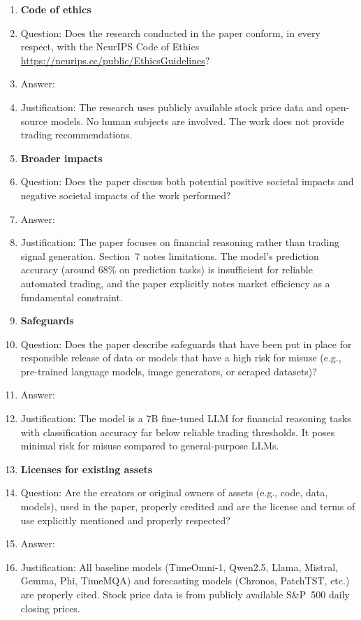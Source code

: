 \begin{enumerate}
\item {\bf Code of ethics}
    \item[] Question: Does the research conducted in the paper conform, in every respect, with the NeurIPS Code of Ethics \url{https://neurips.cc/public/EthicsGuidelines}?
    \item[] Answer: \answerYes{}
    \item[] Justification: The research uses publicly available stock price data and open-source models. No human subjects are involved. The work does not provide trading recommendations.

\item {\bf Broader impacts}
    \item[] Question: Does the paper discuss both potential positive societal impacts and negative societal impacts of the work performed?
    \item[] Answer: \answerYes{}
    \item[] Justification: The paper focuses on financial reasoning rather than trading signal generation. Section~7 notes limitations. The model's prediction accuracy (around 68\% on prediction tasks) is insufficient for reliable automated trading, and the paper explicitly notes market efficiency as a fundamental constraint.

\item {\bf Safeguards}
    \item[] Question: Does the paper describe safeguards that have been put in place for responsible release of data or models that have a high risk for misuse (e.g., pre-trained language models, image generators, or scraped datasets)?
    \item[] Answer: \answerNA{}
    \item[] Justification: The model is a 7B fine-tuned LLM for financial reasoning tasks with classification accuracy far below reliable trading thresholds. It poses minimal risk for misuse compared to general-purpose LLMs.

\item {\bf Licenses for existing assets}
    \item[] Question: Are the creators or original owners of assets (e.g., code, data, models), used in the paper, properly credited and are the license and terms of use explicitly mentioned and properly respected?
    \item[] Answer: \answerYes{}
    \item[] Justification: All baseline models (TimeOmni-1, Qwen2.5, Llama, Mistral, Gemma, Phi, TimeMQA) and forecasting models (Chronos, PatchTST, etc.) are properly cited. Stock price data is from publicly available S\&P~500 daily closing prices.


\end{enumerate}
